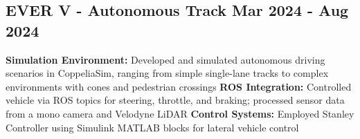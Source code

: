 \subsection*{
  EVER V - Autonomous Track
  \hspace*{\fill}
  \dateformat Mar 2024 - Aug 2024
}
\begin{tasks}
  \task \textbf{Simulation Environment:} Developed and simulated autonomous driving scenarios in CoppeliaSim, ranging from simple single-lane tracks to complex environments with cones and pedestrian crossings
  \task \textbf{ROS Integration:} Controlled vehicle via ROS topics for steering, throttle, and braking; processed sensor data from a mono camera and Velodyne LiDAR
  \task \textbf{Control Systems:} Employed Stanley Controller using Simulink MATLAB blocks for lateral vehicle control
\end{tasks}
%
%

